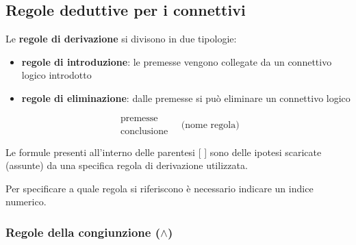 \documentclass[a4paper, 12pt]{book}
\begin{document}
  \subsection*{Regole deduttive per i connettivi}
  Le \textbf{regole di derivazione} si divisono in due tipologie:
  \begin{itemize}
    \item \textbf{regole di introduzione}: le premesse vengono collegate da un connettivo logico introdotto
    \item \textbf{regole di eliminazione}: dalle premesse si può eliminare un connettivo logico
  \end{itemize}

  \[
    \begin{array}{c}
    \text{premesse} \\
    \hline
    \text{conclusione}
    \end{array}%
    \quad \text{(nome regola)}
  \]

  Le formule presenti all'interno delle parentesi [ ] sono delle ipotesi scaricate (assunte) da una specifica regola di derivazione utilizzata.
  
  Per specificare a quale regola si riferiscono è necessario indicare un indice numerico.

  \subsubsection*{Regole della congiunzione ($\land$)}
\end{document}
